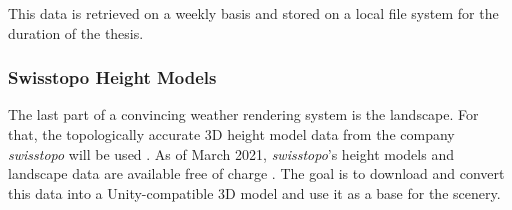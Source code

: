 \noindent
This data is retrieved on a weekly basis and stored on a local file system for the duration of the thesis.

\subsubsection{Swisstopo Height Models}
The last part of a convincing weather rendering system is the landscape. For that, the topologically accurate 3D height model data from the company \emph{swisstopo} will be used \cite{swisstopo}.
As of March 2021, \emph{swisstopo}'s height models and landscape data are available free of charge \cite{swisstopo:free}.
The goal is to download and convert this data into a Unity-compatible 3D model and use it as a base for the scenery.
